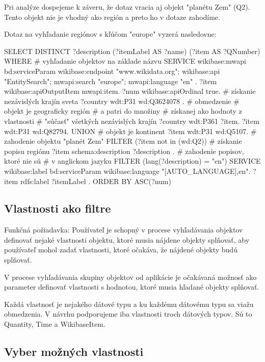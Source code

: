 Pri analýze dospejeme k záveru, že dotaz vracia aj objekt "planétu Zem" (Q2). Tento objekt nie je vhodný ako región a preto ho v dotaze
zahodíme.

Dotaz na vyhľadanie regiónov s kľúčom "europe" vyzerá nasledovne:
\begin{code}
      SELECT DISTINCT
      ?description
      (?itemLabel AS ?name)
      (?item AS ?QNumber)
      WHERE {
      # vyhľadanie objektov na základe názvu
      SERVICE wikibase:mwapi {
      bd:serviceParam wikibase:endpoint "www.wikidata.org";
      wikibase:api "EntitySearch";
      mwapi:search "europe";
      mwapi:language "en" .
      ?item wikibase:apiOutputItem mwapi:item.
      ?num wikibase:apiOrdinal true. }
      # získanie nezávislých krajín sveta
      ?country wdt:P31 wd:Q3624078 .
      # obmedzenie
      # objekt je geograficky región
      # a patri do množiny
      # získanej ako hodnoty z vlastnosti
      # "súčasť" všetkých nezávislých krajín
      { ?country wdt:P361 ?item.
      ?item wdt:P31 wd:Q82794.}
      UNION
      # objekt je kontinent
            { ?item wdt:P31 wd:Q5107.}
      # zahodenie objektu "planét Zem"
      FILTER (?item not in (wd:Q2))
      # získanie popisu regiónu
      ?item schema:description ?description .
      # zahodenie popisov, ktoré nie sú
      # v anglickom jazyku
      FILTER (lang(?description) = "en")
      SERVICE wikibase:label {
      bd:serviceParam wikibase:language "[AUTO_LANGUAGE],en".
      ?item rdfs:label ?itemLabel . }
      } ORDER BY ASC(?num)
\end{code}


\subsection{Vlastnosti ako filtre }
Funkčná požiadavka: Používateľ je schopný v procese vyhľadávania objektov definovať nejaké vlastnosti objektu, ktoré musia nájdene objekty splňovať, aby používateľ mohol zadať vlastnosti,
ktoré očakáva, že nájdené objekty budú splňovať.

V procese vyhľadávania skupiny objektov od aplikácie je očakávaná možnosť ako parameter definovať vlastnosti s hodnotou, ktoré musia hľadané objekty splňovať.

Každá vlastnosť je nejakého dátové typu a ku každému dátovému typu sa viažu obmedzenia. V návrhu podporujeme iba vlastnosti troch dátových typov. Sú to Quantity, Time a WikibaseItem.

\subsection*{Vyber možných vlastnosti }

